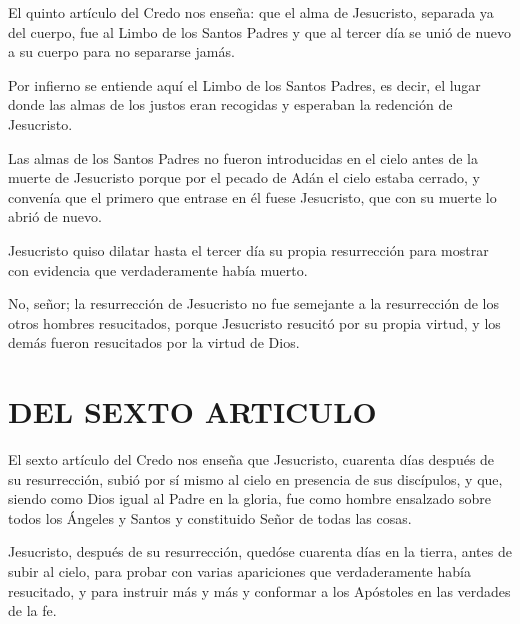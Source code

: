  El quinto artículo del Credo nos enseña: que el alma de Jesucristo, separada ya del cuerpo, fue al Limbo de los Santos Padres y que al tercer día se unió de nuevo a su cuerpo para no separarse jamás.

 Por infierno se entiende aquí el
Limbo de los Santos Padres, es decir, el lugar donde las almas de los justos eran
recogidas y esperaban la redención de Jesucristo.

 Las almas de los Santos Padres no
fueron introducidas en el cielo antes de la muerte de Jesucristo porque por el
pecado de Adán el cielo estaba cerrado, y convenía que el primero que entrase en
él fuese Jesucristo, que con su muerte lo abrió de nuevo.

 Jesucristo quiso dilatar hasta el tercer día su propia resurrección
para mostrar con evidencia que verdaderamente había muerto.

 No, señor; la resurrección de Jesucristo no fue
semejante a la resurrección de los otros hombres resucitados, porque Jesucristo
resucitó por su propia virtud, y los demás fueron resucitados por la virtud de
Dios.

\section{DEL SEXTO ARTICULO}

 El sexto artículo del
Credo nos enseña que Jesucristo, cuarenta días después de su resurrección, subió
por sí mismo al cielo en presencia de sus discípulos, y que, siendo como Dios
igual al Padre en la gloria, fue como hombre ensalzado sobre todos los Ángeles y
Santos y constituido Señor de todas las cosas.

 Jesucristo, después de su
resurrección, quedóse cuarenta días en la tierra, antes de subir al cielo, para probar con varias apariciones que verdaderamente había resucitado, y para instruir más y más y conformar a los Apóstoles en las verdades de la fe.

